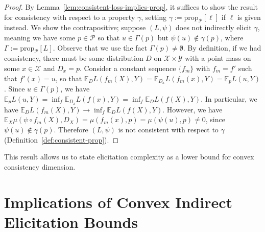 \documentclass{article} %
\newcommand{\Comments}{0}
\newcommand{\mynote}[2]{\ifnum\Comments=1\textcolor{#1}{#2}\fi}
\newcommand{\mytodo}[2]{\ifnum\Comments=1%
	\todo[linecolor=#1!80!black,backgroundcolor=#1,bordercolor=#1!80!black]{#2}\fi}
\newcommand{\raft}[1]{\mytodo{green!20!white}{RF: #1}}
\newcommand{\jessie}[1]{\mynote{teal}{[JF: #1]}}
\newcommand{\simplex}{\Delta_\Y}
\newcommand{\prop}[2][\mathcal{P}]{\mathrm{prop}_{#1}[#2]}
\newcommand{\propdis}{\mu}
\newcommand{\D}{\mathcal{D}}
\newcommand{\E}{\mathbb{E}}
\renewcommand{\P}{\mathcal{P}}
\newcommand{\X}{\mathcal{X}}
\newcommand{\Y}{\mathcal{Y}}
\begin{document}
\begin{proof}
	By Lemma~\ref{lem:consistent-loss-implies-prop}, it suffices to show the result for consistency with respect to a property $\gamma$, setting $\gamma := \prop{\ell}$ if $\ell$ is given instead.
	We show the contrapositive; suppose $(L, \psi)$ does not indirectly elicit $\gamma$, meaning we have some $p \in \P$ so that $u \in \Gamma(p)$ but $\psi(u) \not \in \gamma(p)$, where $\Gamma := \prop{L}$.
	Observe that we use the fact $\Gamma(p) \neq \emptyset$.
	By definition, if we had consistency, there must be some distribution $D$ on $\X\times\Y$ with a point mass on some $x\in\X$ and $D_x = p$.
	Consider a constant sequence $\{f_m\}$ with $f_m = f'$ such that $f'(x) = u$,
	so that $\E_D L(f_m(X), Y) = \E_{D_x} L(f_m(x),Y) = \E_p L(u,Y)$.
	Since $u \in \Gamma(p)$, we have $\E_p L(u,Y) = \inf_f \E_{D_x} L(f(x),Y) = \inf_f \E_D L(f(X),Y)$.
	In particular, we have $\E_D L(f_m(X), Y) \to \inf_f \E_D L(f(X),Y)$.
	However, we have $\E_X \propdis(\psi \circ f_m(X), D_X) = \propdis(f_m(x), p) = \propdis(\psi(u), p) \neq 0$, since $\psi(u) \not \in \gamma(p)$.
	Therefore $(L, \psi)$ is not consistent with respect to $\gamma$ (Definition~\ref{def:consistent-prop}).
\end{proof}

This result allows us to state elicitation complexity as a lower bound for convex consistency dimension.

\elicitationboundsconsistency*


\section{Implications of Convex Indirect Elicitation Bounds}\label{app:implications-of-bounds}
\end{document}
